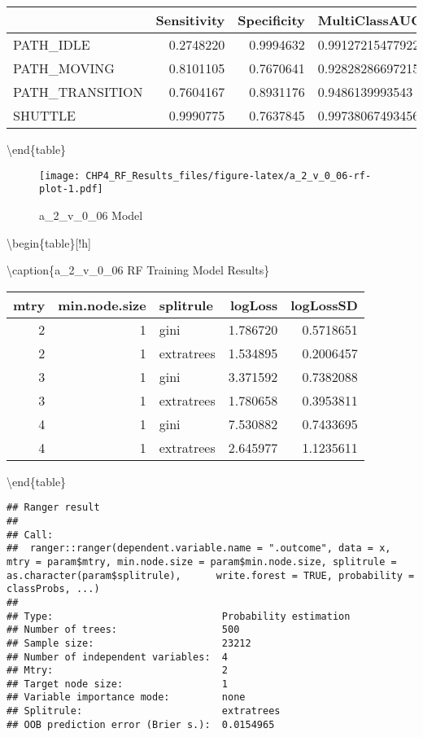 \documentclass[]{article}
\begin{document}
\begin{tabular}[t]{lrrl}
\toprule
  & Sensitivity & Specificity & MultiClassAUC\\
\midrule
PATH\_IDLE & 0.2748220 & 0.9994632 & 0.991272154779222\\
PATH\_MOVING & 0.8101105 & 0.7670641 & 0.928282866972157\\
PATH\_TRANSITION & 0.7604167 & 0.8931176 & 0.9486139993543\\
SHUTTLE & 0.9990775 & 0.7637845 & 0.997380674934569\\
\bottomrule
\end{tabular}

\textbackslash{}end\{table\}

\begin{figure}
\centering
\texttt{[image: CHP4\_RF\_Results\_files/figure-latex/a\_2\_v\_0\_06-rf-plot-1.pdf]}
\caption{a\_2\_v\_0\_06 Model}
\end{figure}

\textbackslash{}begin\{table\}{[}!h{]}

\textbackslash{}caption\{\label{tab:a_2_v_0_06-rf-params}a\_2\_v\_0\_06
RF Training Model Results\} \centering

\begin{tabular}[t]{rrlrr}
\toprule
mtry & min.node.size & splitrule & logLoss & logLossSD\\
\midrule
2 & 1 & gini & 1.786720 & 0.5718651\\
2 & 1 & extratrees & 1.534895 & 0.2006457\\
3 & 1 & gini & 3.371592 & 0.7382088\\
3 & 1 & extratrees & 1.780658 & 0.3953811\\
4 & 1 & gini & 7.530882 & 0.7433695\\
4 & 1 & extratrees & 2.645977 & 1.1235611\\
\bottomrule
\end{tabular}

\textbackslash{}end\{table\}

\begin{verbatim}
## Ranger result
## 
## Call:
##  ranger::ranger(dependent.variable.name = ".outcome", data = x,      mtry = param$mtry, min.node.size = param$min.node.size, splitrule = as.character(param$splitrule),      write.forest = TRUE, probability = classProbs, ...) 
## 
## Type:                             Probability estimation 
## Number of trees:                  500 
## Sample size:                      23212 
## Number of independent variables:  4 
## Mtry:                             2 
## Target node size:                 1 
## Variable importance mode:         none 
## Splitrule:                        extratrees 
## OOB prediction error (Brier s.):  0.0154965
\end{verbatim}
\end{document}
